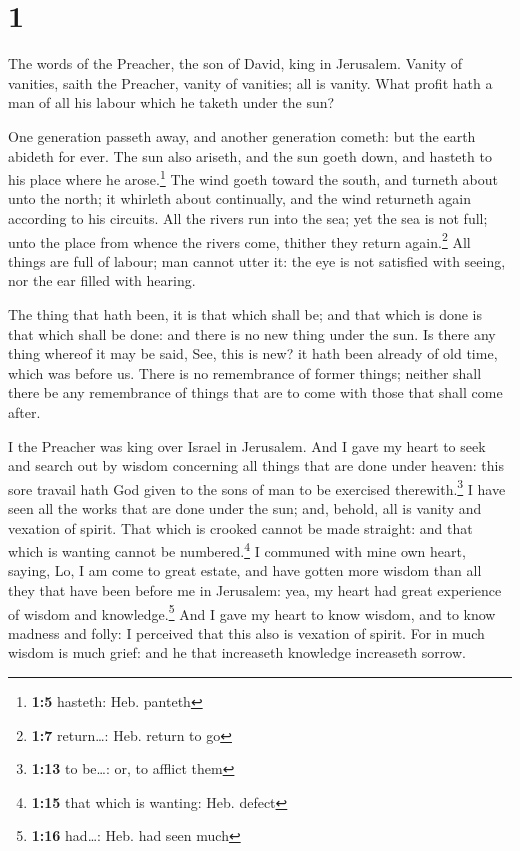 \hypertarget{section}{%
\section{1}\label{section}}

 The words of the Preacher, the son of David, king in
Jerusalem.  Vanity of vanities, saith the Preacher, vanity
of vanities; all is vanity.  What profit hath a man of all
his labour which he taketh under the sun?

 One generation passeth away, and another generation
cometh: but the earth abideth for ever.  The sun also
ariseth, and the sun goeth down, and hasteth to his place where he
arose.\footnote{\textbf{1:5} hasteth: Heb. panteth}  The
wind goeth toward the south, and turneth about unto the north; it
whirleth about continually, and the wind returneth again according to
his circuits.  All the rivers run into the sea; yet the
sea is not full; unto the place from whence the rivers come, thither
they return again.\footnote{\textbf{1:7} return\ldots: Heb. return to go}
 All things are full of labour; man cannot utter it: the
eye is not satisfied with seeing, nor the ear filled with hearing.

 The thing that hath been, it is that which shall be; and
that which is done is that which shall be done: and there is no new
thing under the sun.  Is there any thing whereof it may
be said, See, this is new? it hath been already of old time, which was
before us.  There is no remembrance of former things;
neither shall there be any remembrance of things that are to come with
those that shall come after.

 I the Preacher was king over Israel in Jerusalem.
 And I gave my heart to seek and search out by wisdom
concerning all things that are done under heaven: this sore travail hath
God given to the sons of man to be exercised therewith.\footnote{\textbf{1:13}
  to be\ldots: or, to afflict them}  I have seen all the
works that are done under the sun; and, behold, all is vanity and
vexation of spirit.  That which is crooked cannot be made
straight: and that which is wanting cannot be numbered.\footnote{\textbf{1:15}
  that which is wanting: Heb. defect}  I communed with
mine own heart, saying, Lo, I am come to great estate, and have gotten
more wisdom than all they that have been before me in Jerusalem: yea, my
heart had great experience of wisdom and knowledge.\footnote{\textbf{1:16}
  had\ldots: Heb. had seen much}  And I gave my heart to
know wisdom, and to know madness and folly: I perceived that this also
is vexation of spirit.  For in much wisdom is much grief:
and he that increaseth knowledge increaseth sorrow.

